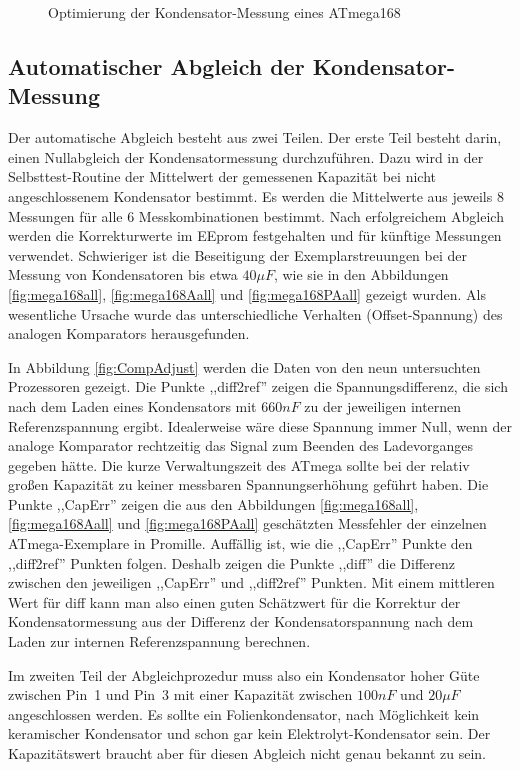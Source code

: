 \begin{figure}[H]
\centering

\caption{Optimierung der Kondensator-Messung eines ATmega168}
\label{fig:mega168optcap}
\end{figure}

\subsection{Automatischer Abgleich der Kondensator-Messung}

Der automatische Abgleich besteht aus zwei Teilen. Der erste Teil besteht darin, einen Nullabgleich der Kondensatormessung durchzuführen.
Dazu wird in der Selbsttest-Routine der Mittelwert der gemessenen Kapazität bei nicht angeschlossenem Kondensator bestimmt.
Es werden die Mittelwerte aus jeweils 8 Messungen für alle 6 Messkombinationen bestimmt.
Nach erfolgreichem Abgleich werden die Korrekturwerte im EEprom festgehalten und für künftige Messungen verwendet.
Schwieriger ist die Beseitigung der Exemplarstreuungen bei der Messung von Kondensatoren bis etwa \(40 \mu F\), wie sie in den 
Abbildungen \ref{fig:mega168all}, \ref{fig:mega168Aall} und \ref{fig:mega168PAall} gezeigt wurden.
Als wesentliche Ursache wurde das unterschiedliche Verhalten (Offset-Spannung) des analogen Komparators herausgefunden.

In Abbildung \ref{fig:CompAdjust} werden die Daten von den neun untersuchten Prozessoren gezeigt.
Die Punkte ,,diff2ref'' zeigen die Spannungsdifferenz, die sich nach dem Laden eines Kondensators mit \(660 nF\) zu der
jeweiligen internen Referenzspannung ergibt. Idealerweise wäre diese Spannung immer Null, wenn der analoge
Komparator rechtzeitig das Signal zum Beenden des Ladevorganges gegeben hätte. Die kurze Verwaltungszeit des ATmega
sollte bei der relativ großen Kapazität zu keiner messbaren Spannungserhöhung geführt haben.
Die Punkte ,,CapErr'' zeigen die aus den Abbildungen \ref{fig:mega168all}, \ref{fig:mega168Aall} und \ref{fig:mega168PAall} 
geschätzten Messfehler der einzelnen ATmega-Exemplare in Promille.
Auffällig ist, wie die ,,CapErr'' Punkte den ,,diff2ref'' Punkten folgen.
Deshalb zeigen die Punkte ,,diff'' die Differenz zwischen den jeweiligen ,,CapErr'' und ,,diff2ref'' Punkten.
Mit einem mittleren Wert für diff kann man also einen guten Schätzwert für die Korrektur der Kondensatormessung aus der
Differenz der Kondensatorspannung nach dem Laden zur internen Referenzspannung berechnen.

Im zweiten Teil der Abgleichprozedur muss also ein Kondensator hoher Güte zwischen Pin~1 und Pin~3 mit einer
Kapazität zwischen \(100 nF\) und \(20 \mu F\) angeschlossen werden. 
Es sollte ein Folienkondensator, nach Möglichkeit kein keramischer Kondensator und schon gar kein
Elektrolyt-Kondensator sein. Der Kapazitätswert braucht aber für diesen Abgleich nicht genau bekannt zu sein.

